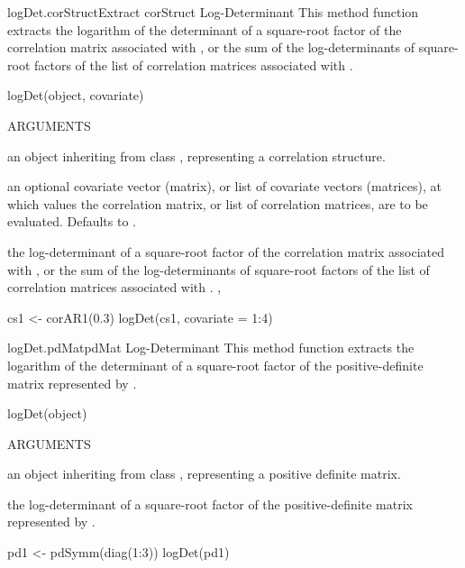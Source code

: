 \documentclass[pdftex]{article} \usepackage{url,graphicx}
\begin{document}
\begin{Helpfile}{logDet.corStruct}{Extract corStruct Log-Determinant}
This method function extracts the logarithm of the determinant of a
square-root factor of the correlation matrix associated with
, or the sum of the log-determinants of square-root
factors of the list of correlation matrices associated with
.
\begin{Example}
logDet(object, covariate)
\end{Example}
\begin{Argument}{ARGUMENTS}
\item[\Co{object:}]
an object inheriting from class ,
representing a correlation structure.
\item[\Co{covariate:}]
an optional covariate vector (matrix), or list of
covariate vectors (matrices), at which values the correlation matrix,
or list of correlation  matrices, are to be evaluated. Defaults to
.
\end{Argument}
the log-determinant of a square-root factor of the correlation matrix
associated with , or the sum of the log-determinants of
square-root factors of the list of correlation matrices associated
with .
, 
\need 15pt
\vspace{-16pt} 
\begin{Example}
cs1 <- corAR1(0.3)
logDet(cs1, covariate = 1:4)
\end{Example}
\end{Helpfile}
\begin{Helpfile}{logDet.pdMat}{pdMat Log-Determinant}
This method function extracts the logarithm of the determinant of a
square-root factor of the positive-definite matrix represented by
.
\begin{Example}
logDet(object)
\end{Example}
\begin{Argument}{ARGUMENTS}
\item[\Co{object:}]
an object inheriting from class , representing
a positive definite matrix.
\end{Argument}
the log-determinant of a square-root factor of the positive-definite
matrix represented by .
\need 15pt
\vspace{-16pt} 
\begin{Example}
pd1 <- pdSymm(diag(1:3))
logDet(pd1)
\end{Example}
\end{Helpfile}
\end{document}
